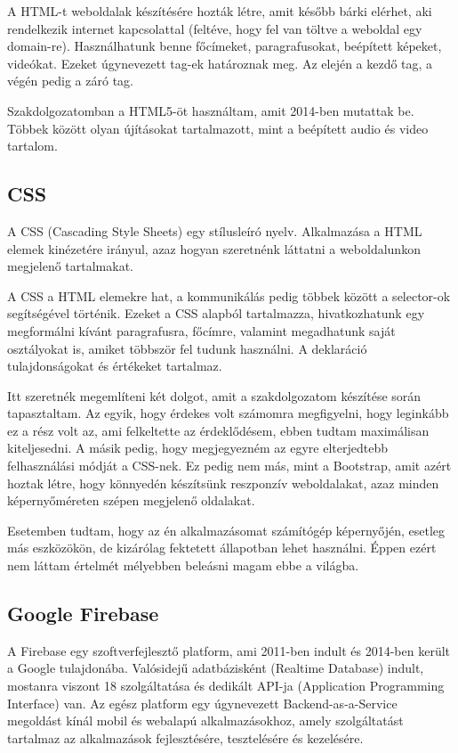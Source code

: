 A HTML-t weboldalak készítésére hozták létre, amit később bárki elérhet, aki rendelkezik internet kapcsolattal (feltéve, hogy fel van töltve a weboldal egy domain-re). Használhatunk benne főcímeket, paragrafusokat, beépített képeket, videókat. Ezeket úgynevezett tag-ek határoznak meg. Az elején a kezdő tag, a végén pedig a záró tag.

Szakdolgozatomban a HTML5-öt használtam, amit 2014-ben mutattak be. Többek között olyan újításokat tartalmazott, mint a beépített audio és video tartalom.

\subsection{CSS}

A CSS (Cascading Style Sheets) egy stílusleíró nyelv. Alkalmazása a HTML elemek kinézetére irányul, azaz hogyan szeretnénk láttatni a weboldalunkon megjelenő tartalmakat.

A CSS a HTML elemekre hat, a kommunikálás pedig többek között a selector-ok segítségével történik. Ezeket a CSS alapból tartalmazza, hivatkozhatunk egy megformálni kívánt paragrafusra, főcímre, valamint megadhatunk saját osztályokat is, amiket többször fel tudunk használni. A deklaráció tulajdonságokat és értékeket tartalmaz.

Itt szeretnék megemlíteni két dolgot, amit a szakdolgozatom készítése során tapasztaltam. Az egyik, hogy érdekes volt számomra megfigyelni, hogy leginkább ez a rész volt az, ami felkeltette az érdeklődésem, ebben tudtam maximálisan kiteljesedni. A másik pedig, hogy megjegyezném az egyre elterjedtebb felhasználási módját a CSS-nek. Ez pedig nem más, mint a Bootstrap, amit azért hoztak létre, hogy könnyedén készítsünk reszponzív weboldalakat, azaz minden képernyőméreten szépen megjelenő oldalakat.

Esetemben tudtam, hogy az én alkalmazásomat számítógép képernyőjén, esetleg más eszközökön, de kizárólag fektetett állapotban lehet használni. Éppen ezért nem láttam értelmét mélyebben beleásni magam ebbe a világba.

\subsection{Google Firebase}
A Firebase egy szoftverfejlesztő platform, ami 2011-ben indult és 2014-ben került a Google tulajdonába. Valósidejű adatbázisként (Realtime Database) indult, mostanra viszont 18 szolgáltatása és dedikált API-ja (Application Programming Interface) van. Az egész platform egy úgynevezett Backend-as-a-Service megoldást kínál mobil és webalapú alkalmazásokhoz, amely szolgáltatást tartalmaz az alkalmazások fejlesztésére, tesztelésére és kezelésére. 


